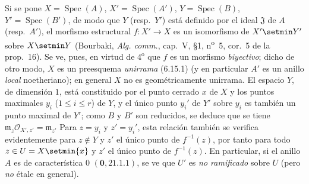 \begin{env}[21.13.9]
Si se pone $X=\operatorname{Spec}(A)$, $X'=\operatorname{Spec}(A')$,
$Y=\operatorname{Spec}(B)$, $Y'=\operatorname{Spec}(B')$, de modo que $Y$
(resp.\ $Y'$) está definido por el ideal $\mathfrak J$ de $A$ (resp.\ $A'$), el morfismo
estructural $f:X'\to X$ es un isomorfismo de $X'\setmin Y'$ sobre $X\setmin Y$ (Bourbaki,
\emph{Alg. comm.}, cap.~V, \S1, n\textsuperscript{o}~5, cor.~5 de la prop.~16). Se
ve, pues, en virtud de $4^{\mathrm o}$ que $f$ es un morfismo \emph{biyectivo}; dicho
de otro modo, $X$ es un preesquema \emph{unirrama} (6.15.1) (y en particular
$A'$ es un anillo \emph{local} noetheriano); en general $X$ no es geométricamente
unirrama. El espacio $Y$, de dimensión $1$, está constituido por el punto cerrado $x$ de
$X$ y los puntos maximales $y_i$ ($1\leq i\leq r$) de $Y$, y el único punto $y_i'$
de $Y'$ sobre $y_i$ es también un punto maximal de $Y'$; como $B$ y $B'$ son
reducidos, se deduce que se tiene
$\mathfrak m_z\mathcal O_{X',z'}=\mathfrak m_{z'}$
Para $z=y_i$ y $z'=y_i'$, esta relación también se verifica evidentemente para
$z\notin Y$ y $z'$ el único punto de $f^{-1}(z)$, por tanto para todo
$z\in U=X\setmin\{x\}$ y $z'$ el único punto de $f^{-1}(z)$. En particular, si el anillo
$A$ es de característica $0$ $(\mathbf 0, 21.1.1)$, se ve que $U'$ es \emph{no ramificado} sobre
$U$ (pero \emph{no} étale en general).


\end{env}
